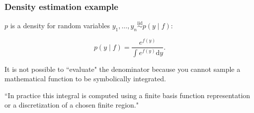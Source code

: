 \documentclass{beamer}
\begin{document}
\begin{frame}
\frametitle{Density estimation example}

$p$ is a density for random variables $y_1, \ldots, y_n \overset{\text{iid}}{\sim} p(y \mid f)$: 

$$
p(y \mid f) = \frac{e^{f(y)} }{ \int e^{f(y)} \text{d}y }.
$$

It is not possible to ``evaluate" the denominator because you cannot sample a mathematical function to be symbolically integrated. 
\newline

``In practice this integral is computed using a finite basis function representation or a discretization of a chosen finite region." 

\end{frame}
\end{document}
